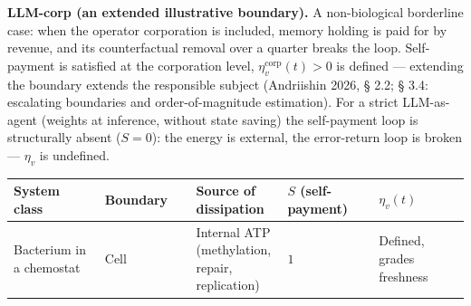 \documentclass[pdflatex,sn-mathphys-ay]{sn-jnl}
\begin{document}
\textbf{LLM-corp (an extended illustrative boundary).} A non-biological borderline case: when the operator corporation is included, memory holding is paid for by revenue, and its counterfactual removal over a quarter breaks the loop. Self-payment is satisfied at the corporation level, \(\eta_v^{\text{corp}}(t) > 0\) is defined --- extending the boundary extends the responsible subject (Andriishin 2026, § 2.2; § 3.4: escalating boundaries and order-of-magnitude estimation). For a strict LLM-as-agent (weights at inference, without state saving) the self-payment loop is structurally absent (\(S = 0\)): the energy is external, the error-return loop is broken --- \(\eta_v\) is undefined.



\begin{center}\small
\begin{tabular}{@{} >{\raggedright\arraybackslash}p{0.2000\linewidth} >{\raggedright\arraybackslash}p{0.2000\linewidth} >{\raggedright\arraybackslash}p{0.2000\linewidth} >{\raggedright\arraybackslash}p{0.2000\linewidth} >{\raggedright\arraybackslash}p{0.2000\linewidth}@{}}
\toprule

\begin{minipage}[b]{\linewidth}\raggedright

System class

\end{minipage} & \begin{minipage}[b]{\linewidth}\raggedright

Boundary

\end{minipage} & \begin{minipage}[b]{\linewidth}\raggedright

Source of dissipation

\end{minipage} & \begin{minipage}[b]{\linewidth}\raggedright

\(S\) (self-payment)

\end{minipage} & \begin{minipage}[b]{\linewidth}\raggedright

\(\eta_v(t)\)

\end{minipage} \\

\midrule

Bacterium in a chemostat & Cell & Internal ATP (methylation, repair, replication) & \(1\) & Defined, grades freshness \\


\end{tabular}
\end{center}
\end{document}

